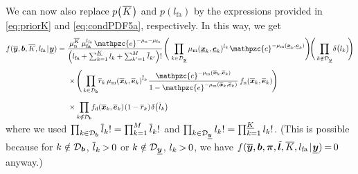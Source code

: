 \documentclass[11pt,a4paper]{article}
\newcommand{\ist}{\hspace*{.3mm}}
\newcommand{\rmv}{\hspace*{-.3mm}}
\newcommand{\cl}[1]{\mathcal{#1}}
\newcommand{\nn}{\nonumber}
\newcommand{\xnew}{\overline{\V{x}}}
\newcommand{\enew}{\overline{\V{e}}}
\newcommand{\rnew}{\overline{r}}
\newcommand{\fd}{f_{\mathrm{d}}}
\begin{document}
We can now also replace $p\big( \ist \overline{K} \ist\big)$ and $p(l_{\mathrm{fa}} )$ by the expressions provided in \eqref{eq:priorK} and  \eqref{eq:condPDF5a}, respectively. In this way, we \vspace{-2mm} get
\begin{align}
f(\overline{\V{y}}, \V{b}, \overline{K}, l_{\mathrm{fa}} \ist | \ist \underline{\V{y}})&=  \frac{\ist \mu^{\overline{K}}_{\mathrm{n}} \ist\ist\ist \mu^{l_{\mathrm{fa}}}_{\mathrm{fa}} \ist\ist \mathpzc{e}^{- \mu_{\mathrm{n}} - \mu_{\mathrm{fa}}}}{\Big( l_{\mathrm{fa}}  + \sum^{\underline{K}}_{k=1}  l_{k}  +  \sum^{M}_{k'=1} \ist \overline{l}_{k'}  \Big)!} \ist \Bigg ( \ist \prod_{k \in \cl{D}_{\underline{\V{y}}}} \mu_{\mathrm{m}} (\underline{\V{x}}_k,\underline{\V{e}}_k)^{l_k} \ist \mathpzc{e}^{-\mu_{\mathrm{m}}(\underline{\V{x}}_k,\underline{\V{e}}_k)} \Bigg) \rmv \rmv \Bigg( \prod_{k \notin \cl{D}_{\underline{\V{y}}}}  \rmv \delta \big(l_{k}\big) \rmv\rmv  \Bigg) \nn \\[1.5mm]
&\hspace{5mm}\times \rmv \Bigg(  \prod_{k \in \Set{D}_{\V{b}}} \rmv\rmv \rnew_k \ist\ist \mu_{\mathrm{m}}(\overline{\V{x}}_k,\overline{\V{e}}_k)^{\overline{l}_{k} }\ist \frac{\mathpzc{e}^{-\mu_{\mathrm{m}}(\overline{\V{x}}_k,\overline{\V{e}}_k)}}{1-\mathpzc{e}^{-\mu_{\mathrm{m}}(\overline{\V{x}}_k,\overline{\V{e}}_k)}} \ist\ist f_{\mathrm{n}}(\overline{\V{x}}_k, \overline{\V{e}}_k) \rmv \Bigg) \nn\\[2.3mm]
&\hspace{5mm}\times \prod_{k \notin \Set{D}_{\V{b}}}  \rmv\rmv\rmv \fd(\xnew_k,\enew_k) \ist (1-\rnew_k) \ist \delta\big(\ist \overline{l}_{k} \big) \rmv \nn \\[-7.5mm]
\nn
\end{align}
where we used $\prod_{k \in \Set{D}_{\V{b}}}  \overline{l}_{k}! = \prod^{M}_{k = 1}  \overline{l}_{k}! $ and $\prod_{k \in \Set{D}_{\underline{\V{y}}}} l_{k}! = \prod^{\underline{K}}_{k=1} l_{k}!$. (This is possible because for $k \notin \Set{D}_{\V{b}}$, $\overline{l}_{k} \rmv>\rmv 0$ or $k \notin \Set{D}_{\underline{\V{y}}}$, $l_{k} \rmv>\rmv 0$, we have $f(\overline{\V{y}}, \V{b}, \V{\pi}, \tilde{\V{l}}, \overline{K}, l_{\mathrm{fa}} \ist | \ist \underline{\V{y}}) \rmv = \rmv 0$ anyway.)
\end{document}
